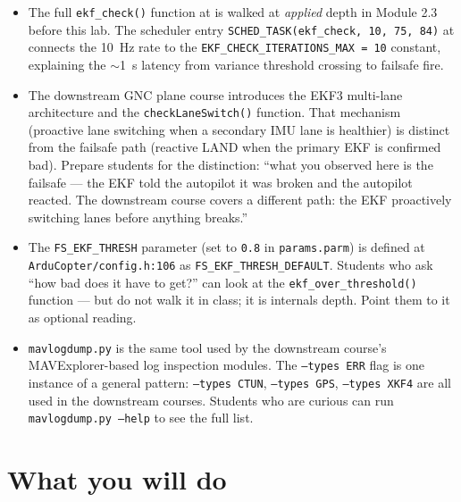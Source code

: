 \documentclass[a4paper,11pt,twoside]{article}
\begin{document}
\begin{itemize}
  \item The full \texttt{ekf\_check()} function at  is walked at \emph{applied} depth in Module 2.3 before this lab. The scheduler entry \texttt{SCHED\_TASK(ekf\_check, 10, 75, 84)} at  connects the 10~Hz rate to the \texttt{EKF\_CHECK\_ITERATIONS\_MAX = 10} constant, explaining the $\sim$1~s latency from variance threshold crossing to failsafe fire.

  \item The downstream GNC plane course introduces the EKF3 multi-lane architecture and the \texttt{checkLaneSwitch()} function. That mechanism (proactive lane switching when a secondary IMU lane is healthier) is distinct from the failsafe path (reactive LAND when the primary EKF is confirmed bad). Prepare students for the distinction: ``what you observed here is the failsafe --- the EKF told the autopilot it was broken and the autopilot reacted. The downstream course covers a different path: the EKF proactively switching lanes before anything breaks.''

  \item The \texttt{FS\_EKF\_THRESH} parameter (set to \texttt{0.8} in \texttt{params.parm}) is defined at \texttt{ArduCopter/config.h:106} as \texttt{FS\_EKF\_THRESH\_DEFAULT}. Students who ask ``how bad does it have to get?'' can look at the \texttt{ekf\_over\_threshold()} function --- but do not walk it in class; it is internals depth. Point them to it as optional reading.

  \item \texttt{mavlogdump.py} is the same tool used by the downstream course's MAVExplorer-based log inspection modules. The \texttt{--types ERR} flag is one instance of a general pattern: \texttt{--types CTUN}, \texttt{--types GPS}, \texttt{--types XKF4} are all used in the downstream courses. Students who are curious can run \texttt{mavlogdump.py --help} to see the full list.
\end{itemize}

\else

\section*{What you will do}
\end{document}
